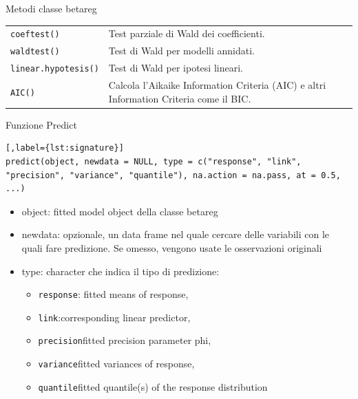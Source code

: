 \documentclass[usenames,dvipsnames]{beamer}
\begin{document}
\begin{frame}[noframenumbering]{Metodi classe betareg}
	\vspace{1cm}
	\begin{table}[t]
		\centering
		\label{MethodTable}
		\begin{tabularx}{\textwidth}{|l|X|}
			\hline
			\texttt{coeftest()}         & Test parziale di Wald dei coefficienti.                             \\
			\texttt{waldtest()}        & Test di Wald per modelli annidati.                      \\
			\texttt{linear.hypotesis()} &  Test di Wald per ipotesi lineari.                \\
			\texttt{AIC()}           & Calcola l'Aikaike Information Criteria (AIC) e altri Information Criteria come il BIC.                      \\ \hline
		\end{tabularx}
	\end{table}
\end{frame}

\begin{frame}{Funzione Predict}
\begin{lstlisting}[,label={lst:signature}]
predict(object, newdata = NULL, type = c("response", "link", "precision", "variance", "quantile"), na.action = na.pass, at = 0.5, ...)
\end{lstlisting}
\begin{itemize}
	\item object: fitted model object della classe betareg
	\item newdata: opzionale, un data frame nel quale cercare delle variabili con le quali fare predizione. Se omesso, vengono usate le osservazioni originali
	\item type: character che indica il tipo di predizione: 
	\begin{itemize}
		\item \texttt{response}: fitted means of response, 
		\item \texttt{link}:corresponding linear predictor, 
		\item \texttt{precision}fitted precision parameter phi, 
		\item \texttt{variance}fitted variances of response, 
		\item \texttt{quantile}fitted quantile(s) of the response distribution 
	\end{itemize}

\end{itemize}
\end{frame}
\end{document}
